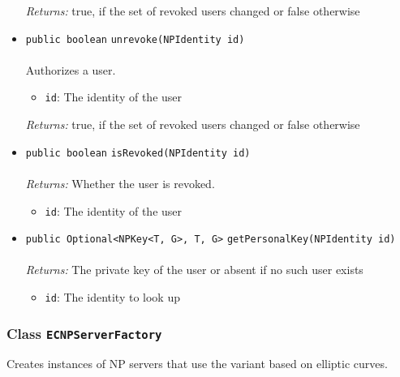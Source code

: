 \begin{itemize}
\emph{Returns:} true, if the set of revoked users changed or false otherwise

\item \lstinline|public boolean| \lstinline|unrevoke|\lstinline|(NPIdentity id)|\\ \\[-0.6em]
Authorizes a user.
\begin{itemize}
\item \lstinline|id|: The identity of the user
\end{itemize}

\emph{Returns:} true, if the set of revoked users changed or false otherwise

\item \lstinline|public boolean| \lstinline|isRevoked|\lstinline|(NPIdentity id)|\\ \\[-0.6em]
\emph{Returns:} Whether the user is revoked.
\begin{itemize}
\item \lstinline|id|: The identity of the user
\end{itemize}



\item \lstinline|public Optional<NPKey<T, G>, T, G>| \lstinline|getPersonalKey|\lstinline|(NPIdentity id)|\\ \\[-0.6em]
\emph{Returns:} The private key of the user or absent if no
 such user exists
\begin{itemize}
\item \lstinline|id|: The identity to look up
\end{itemize}



\end{itemize}

\subsubsection{Class \lstinline|ECNPServerFactory|}
Creates instances of NP servers that use the variant based on elliptic
 curves. \\
\noindent\begin{minipage}[t]{5cm}
\vspace{0.3em}
\hspace*{2em}
\vspace{0.3em}
\end{minipage}



